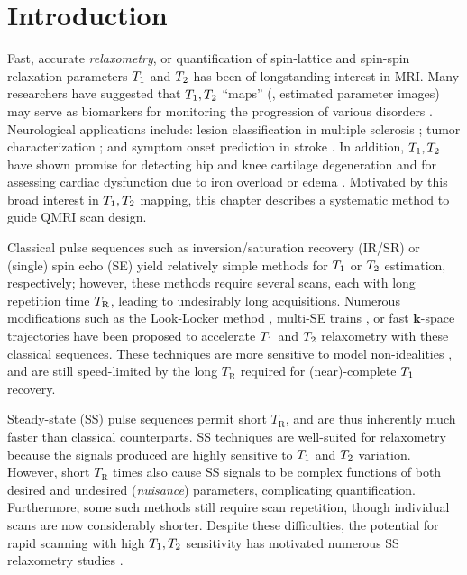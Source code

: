 
\section{Introduction}
\label{s,scn-dsgn,intro}

Fast, accurate \emph{relaxometry}, 
or quantification
of spin-lattice and spin-spin relaxation parameters $T_1$ and $T_2$ 
has been of longstanding interest in MRI. 
Many researchers have suggested 
that $T_1, T_2$ ``maps''
(\ie, estimated parameter images)
may serve as biomarkers 
for monitoring the progression 
of various disorders \cite{cheng:12:pma}. 
Neurological applications include: 
lesion classification in multiple sclerosis 
\cite{larsson:88:ivd}; 
tumor characterization 
\cite{kurki:96:tco, englund:86:rti}; 
and symptom onset prediction in stroke 
\cite{siemonsen:09:qtv, dewitt:87:nnc}. 
In addition, 
$T_1, T_2$ have shown promise 
for detecting hip and knee cartilage degeneration 
\cite{matzat:13:qmt, mosher:04:cmt} 
and for assessing cardiac dysfunction 
due to iron overload \cite{guo:09:mtq} 
or edema \cite{giri:09:tqf}. 
Motivated by this broad interest 
in $T_1, T_2$ mapping, 
this chapter describes a systematic method 
to guide QMRI scan design.

Classical pulse sequences 
such as inversion/saturation recovery (IR/SR) 
or (single) spin echo (SE) 
yield relatively simple methods 
for $T_1$ or $T_2$ estimation, respectively; 
however, these methods require several scans, 
each with long repetition time $T_\mathrm{R}$, 
leading to undesirably long acquisitions. 
Numerous modifications 
such as the Look-Locker method \cite{look:70:tsi}, 
multi-SE trains \cite{carr:54:eod}, 
or fast $\mathbf{k}$-space trajectories 
\cite{stehling:91:epi, ahn:86:hss, meyer:92:fsc} 
have been proposed to accelerate $T_1$ 
\cite{kay:91:pia, gowland:92:faa, messroghli:04:mll, stehling:90:ire} 
and $T_2$ 
\cite{bonny:96:tml, kumar:12:bau, beneliezer:15:raa, nguyen:12:ttd} 
relaxometry 
with these classical sequences.
These techniques are more sensitive 
to model non-idealities 
\cite{majumdar:86:eit-1, majumdar:86:eit-2, farzaneh:90:aot}, 
and are still speed-limited 
by the long $T_\mathrm{R}$ required 
for (near)-complete $T_1$ recovery.

Steady-state (SS) pulse sequences 
\cite{hinshaw:76:ifb, scheffler:99:apd} 
permit short $T_\mathrm{R}$, 
and are thus inherently much faster 
than classical counterparts.
SS techniques are well-suited for relaxometry 
because the signals produced are highly sensitive 
to $T_1$ and $T_2$ variation. 
However, short $T_\mathrm{R}$ times also cause SS signals 
to be complex functions 
of both desired and undesired (\emph{nuisance}) parameters, 
complicating quantification. 
Furthermore, some such methods 
\cite{deoni:03:rct, chang:08:lls} 
still require scan repetition, 
though individual scans are now considerably shorter. 
Despite these difficulties, 
the potential for rapid scanning 
with high $T_1, T_2$ sensitivity 
has motivated numerous SS relaxometry studies 
\cite{fram:87:rco, deoni:03:rct, chang:08:lls, wang:12:srt, deoni:04:rte, deoni:09:trt, welsch:09:reo, heule:14:reo, stocker:14:mpq, heule:14:tes-mrm}.

